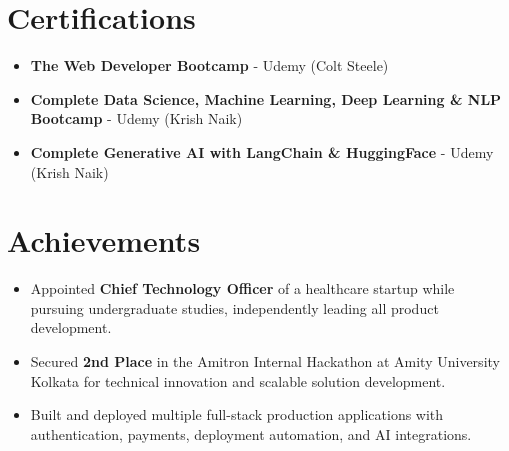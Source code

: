 \documentclass[letterpaper,10pt]{article}
\newcommand{\resumeItem}[1]{
    \item\small{#1\vspace{-2pt}}
}
\newcommand{\resumeItemListStart}{\begin{itemize}[leftmargin=0.2in]}
\newcommand{\resumeItemListEnd}{\end{itemize}\vspace{-5pt}}
\begin{document}
\vspace{-4pt}

\section{Certifications}

\resumeItemListStart
    \resumeItem{\textbf{The Web Developer Bootcamp} - Udemy (Colt Steele)}
    \resumeItem{\textbf{Complete Data Science, Machine Learning, Deep Learning \& NLP Bootcamp} - Udemy (Krish Naik)}
    \resumeItem{\textbf{Complete Generative AI with LangChain \& HuggingFace} - Udemy (Krish Naik)}
\resumeItemListEnd

\vspace{-4pt}

\section{Achievements}

\resumeItemListStart
    \resumeItem{Appointed \textbf{Chief Technology Officer} of a healthcare startup while pursuing undergraduate studies, independently leading all product development.}
    \resumeItem{Secured \textbf{2nd Place} in the Amitron Internal Hackathon at Amity University Kolkata for technical innovation and scalable solution development.}
    \resumeItem{Built and deployed multiple full-stack production applications with authentication, payments, deployment automation, and AI integrations.}
\resumeItemListEnd

\end{document}
